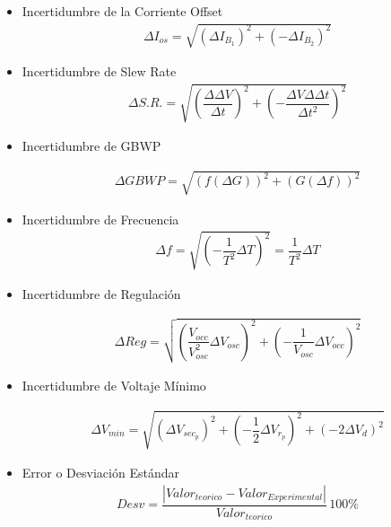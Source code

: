 \begin{itemize}
    \item Incertidumbre de la Corriente Offset
        \begin{gather}
            \Delta I_{os}=\sqrt{(\Delta I_{B_1})^2+(-\Delta I_{B_2})^2}
             \label{eqn:delta_corriente_offset}
        \end{gather}

    \item Incertidumbre de Slew Rate
        \begin{gather}
            \Delta S.R.=\sqrt{\left(\dfrac{\Delta \Delta V}{\Delta t}\right)^2+\left(-\dfrac{\Delta V \Delta \Delta t}{\Delta t^2}\right)^2}
            \label{eqn:delta_slewrate}
        \end{gather}

    \item Incertidumbre de GBWP

        \begin{gather}
            \Delta GBWP=\sqrt{(f(\Delta G))^2+(G(\Delta f))^2}
            \label{eqn:delta_gbwp}
        \end{gather}

    \item Incertidumbre de Frecuencia
        \begin{gather}
            \Delta f = \sqrt{\left(-\dfrac{1}{T^2}\Delta T\right)^2}=\dfrac{1}{T^2}\Delta T
            \label{eqn:delta_frecuencia}
        \end{gather}

    \item Incertidumbre de Regulación

        \begin{gather}
            \Delta Reg=\sqrt{\left(\dfrac{V_{occ}}{V_{osc}^2}\Delta V_{osc}\right)^2+\left(-\dfrac{1}{V_{osc}}\Delta V_{occ}\right)^2}
            \label{eqn:delta_reg}
        \end{gather}
    \item Incertidumbre de Voltaje Mínimo

        \begin{gather}
            \Delta V_{min}=\sqrt{\left(\Delta V_{sec_p}\right)^2+\left(-\dfrac{1}{2}\Delta V_{r_p}\right)^2+\left(-2\Delta V_{d} \right)^2}
            \label{eqn:delta_vmin}
        \end{gather}
        
    \item Error o Desviación Estándar
        \begin{gather}
            Desv=\dfrac{|Valor_{teorico}-Valor_{Experimental}|}{Valor_{teorico}} \, 100\%
            \label{eqn:desviación}
        \end{gather}
        
\end{itemize}